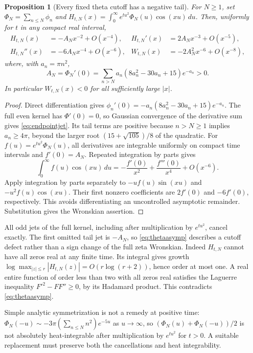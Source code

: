 \documentclass[11pt]{article}
\numberwithin{equation}{section}
\newtheorem{proposition}[theorem]{Proposition}
\theoremstyle{definition}
\theoremstyle{remark}
\newcommand{\dd}{\,d}
\begin{document}
\begin{proposition}[Every fixed theta cutoff has a negative tail]
\label{prop:thetacutoff}
For $N\ge1$, set $\Phi_N=\sum_{n\le N}\phi_n$ and
$H_{t,N}(x)=\int_0^\infty e^{tu^2}\Phi_N(u)\cos(xu)\dd u$.
Then, uniformly for $t$ in any compact real interval,
\begin{align}\label{eq:thetaasymp}
 H_{t,N}(x)&=-A_Nx^{-2}+O(x^{-4}),&
 H_{t,N}'(x)&=2A_Nx^{-3}+O(x^{-5}),\\
 H_{t,N}''(x)&=-6A_Nx^{-4}+O(x^{-6}),&
 W_{t,N}(x)&=-2A_N^2x^{-6}+O(x^{-8}),\nonumber
\end{align}
where, with $a_n=\pi n^2$,
\begin{equation}\label{eq:endpointjet}
 A_N=\Phi_N'(0)
 =\sum_{n>N}a_n(8a_n^2-30a_n+15)e^{-a_n}>0.
\end{equation}
In particular $W_{t,N}(x)<0$ for all sufficiently large $|x|$.
\end{proposition}
\begin{proof}
Direct differentiation gives
$\phi_n'(0)=-a_n(8a_n^2-30a_n+15)e^{-a_n}$.
The full even kernel has $\Phi'(0)=0$, so Gaussian convergence of the
derivative sum gives \eqref{eq:endpointjet}. Its tail terms are positive
because $n>N\ge1$ implies $a_n\ge4\pi$, beyond the larger root
$(15+\sqrt{105})/8$ of the quadratic. For
$f(u)=e^{tu^2}\Phi_N(u)$, all derivatives are integrable uniformly
on compact time intervals and $f'(0)=A_N$. Repeated integration by
parts gives
\[
 \int_0^\infty f(u)\cos(xu)\dd u
 =-\frac{f'(0)}{x^2}+\frac{f'''(0)}{x^4}+O(x^{-6}).
\]
Apply integration by parts separately to $-u f(u)\sin(xu)$ and
$-u^2 f(u)\cos(xu)$. Their first nonzero coefficients are
$2f'(0)$ and $-6f'(0)$, respectively. This avoids differentiating
an uncontrolled asymptotic remainder. Substitution gives the
Wronskian assertion.
\end{proof}

All odd jets of the full kernel, including after multiplication by
$e^{tu^2}$, cancel exactly. The first omitted tail jet is $-A_N$,
so \eqref{eq:thetaasymp} describes a cutoff defect rather than a sign
change of the full zeta Wronskian. Indeed $H_{t,N}$ cannot have all
zeros real at any finite time. Its integral gives growth
$\log\max_{|z|\le r}|H_{t,N}(z)|=O(r\log(r+2))$, hence order at
most one. A real entire function of order less than two with all zeros
real satisfies the Laguerre inequality $F'^2-FF''\ge0$, by its
Hadamard product. This contradicts \eqref{eq:thetaasymp}.

Simple analytic symmetrization is not a remedy at positive time:
$\Phi_N(-u)\sim-3\pi(\sum_{n\le N}n^2)e^{-5u}$ as $u\to\infty$,
so $(\Phi_N(u)+\Phi_N(-u))/2$ is not absolutely heat-integrable
after multiplication by $e^{tu^2}$ for $t>0$. A suitable replacement
must preserve both the cancellations and heat integrability.
\end{document}
